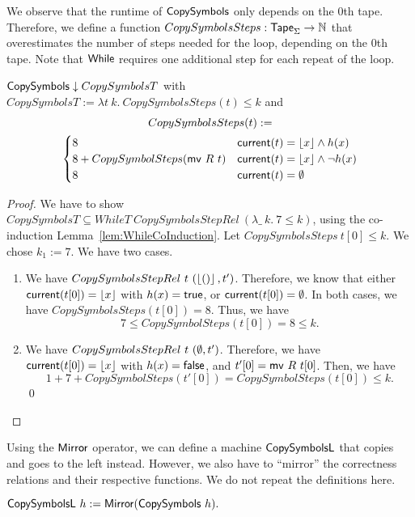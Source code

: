 We observe that the runtime of $\mathsf{CopySymbols}$ only depends on the $0$th tape.  Therefore, we define a function
$CopySymbolsSteps : \mathsf{Tape}_\Sigma \rightarrow \mathbb{N}$ that overestimates the number of steps needed for the loop, depending on the $0$th tape.  Note that
$\mathsf{While}$ requires one additional step for each repeat of the loop.
\begin{lemma}
  $\mathsf{CopySymbols} \mathrel{\downarrow} CopySymbolsT$ with \\
  $CopySymbolsT := \lambda t~k.~CopySymbolsSteps(t) \leq k$ and
  \begin{multline*}
    CopySymbolsSteps (t) := \\
    \begin{cases}
      8                                & \mathsf{current}(t)=\left\lfloor {x} \right\rfloor \land h(x) \\
      8 + CopySymbolSteps(\mathsf{mv}~R~t) & \mathsf{current}(t)=\left\lfloor {x} \right\rfloor \land \lnot h(x) \\
      8                                & \mathsf{current}(t)=\emptyset
    \end{cases}
  \end{multline*}
\end{lemma}
\begin{proof}
  We have to show $CopySymbolsT \subseteq WhileT~CopySymbolsStepRel~(\lambda \_~k.~7 \leq k)$, using the co-induction
  Lemma~\ref{lem:WhileCoInduction}.  Let $CopySymbolsSteps~t[0] \leq k$.  We chose $k_1 := 7$.  We have two cases.
  \begin{enumerate}
  \item We have $CopySymbolsStepRel~t~(\left\lfloor {\ensuremath{\mathsf{()}}} \right\rfloor, t')$.  Therefore, we know that either $\mathsf{current}(t[0])=\left\lfloor {x} \right\rfloor$ with $h(x)=\mathsf{true}$, or
    $\mathsf{current}(t[0])=\emptyset$.  In both cases, we have $CopySymbolsSteps(t[0]) = 8$.  Thus, we have
    $$ 7 \leq CopySymbolSteps(t[0]) = 8 \leq k. $$
  \item We have $CopySymbolsStepRel~t~(\emptyset, t')$.  Therefore, we have $\mathsf{current}(t[0])=\left\lfloor {x} \right\rfloor$ with $h(x)=\mathsf{false}$, and $t'[0]=\mathsf{mv}~R~t[0]$.
    Then, we have
    $$ 1+7+CopySymbolSteps(t'[0]) = CopySymbolSteps(t[0]) \leq k.$$
    \qed
  \end{enumerate}
\end{proof}

Using the $\mathsf{Mirror}$ operator, we can define a machine $\MS{CopySymbolsL}$ that copies and goes to the left instead.  However, we also have to
``mirror'' the correctness relations and their respective functions.  We do not repeat the definitions here.
\begin{definition}[$\MS{CopySymbolsL}$]
  $\mathsf{CopySymbolsL}~h := \mathsf{Mirror}(\mathsf{CopySymbols}~h).$
\end{definition}

